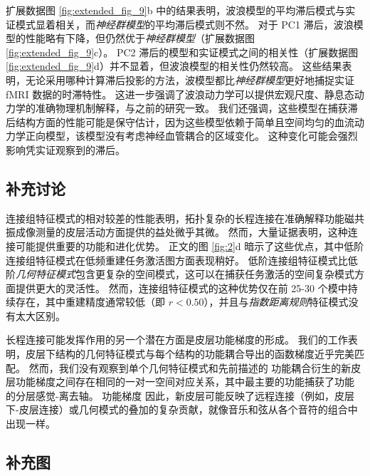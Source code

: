 \documentclass[lang=cn,a4paper,newtx,citestyle=gb7714-2015, bibstyle=gb7714-2015]{elegantpaper}
\begin{document}
扩展数据图 \ref{fig:extended_fig_9}b 中的结果表明，波浪模型的平均滞后模式与实证模式显着相关，而\textit{神经群模型}的平均滞后模式则不然。
对于 PC1 滞后，波浪模型的性能略有下降，但仍然优于\textit{神经群模型}（扩展数据图 \ref{fig:extended_fig_9}c）。
PC2 滞后的模型和实证模式之间的相关性（扩展数据图 \ref{fig:extended_fig_9}d）并不显着，但波浪模型的相关性仍然较高。
这些结果表明，无论采用哪种计算滞后投影的方法，波模型都比\textit{神经群模型}更好地捕捉实证 fMRI 数据的时滞特性。
这进一步强调了波浪动力学可以提供宏观尺度、静息态动力学的准确物理机制解释，与之前的研究一致\cite{robinson2021determination,majeed2011spatiotemporal,matsui2016transient}。
我们还强调，这些模型在捕获滞后结构方面的性能可能是保守估计，因为这些模型依赖于简单且空间均匀的血流动力学正向模型，该模型没有考虑神经血管耦合的区域变化\cite{deco2021dynamical,henderson2022empirical,fischl2012freesurfer}。
这种变化可能会强烈影响凭实证观察到的滞后。


\subsection{补充讨论} \label{sec:supplementary_discussion}

连接组特征模式的相对较差的性能表明，拓扑复杂的长程连接在准确解释功能磁共振成像测量的皮层活动方面提供的益处微乎其微。
然而，大量证据表明，这种连接可能提供重要的功能和进化优势\cite{oldham2020efficacy,arslan2018human,tokariev2019large}。
正文的图 \ref{fig:2}d 暗示了这些优点，其中低阶连接组特征模式在低频重建任务激活图方面表现稍好。
低阶连接组特征模式比低阶\textit{几何特征模式}包含更复杂的空间模式，这可以在捕获任务激活的空间复杂模式方面提供更大的灵活性。
然而，连接组特征模式的这种优势仅在前 25-30 个模中持续存在，其中重建精度通常较低（即 $ r < 0.50 $），并且与\textit{指数距离规则}特征模式没有太大区别。


长程连接可能发挥作用的另一个潜在方面是皮层功能梯度的形成。
我们的工作表明，皮层下结构的几何特征模式与每个结构的功能耦合导出的函数梯度近乎完美匹配。
然而，我们没有观察到单个几何特征模式和先前描述的 功能耦合衍生的新皮层功能梯度之间存在相同的一对一空间对应关系，其中最主要的功能捕获了功能\cite{chen2022individuality} 的分层感觉-离去轴。
功能梯度 因此，新皮层可能反映了远程连接（例如，皮层下-皮层连接）或几何模式\cite{bolt2022parsimonious}的叠加的复杂贡献，就像音乐和弦从各个音符的组合中出现一样。



\subsection{补充图}
\end{document}
